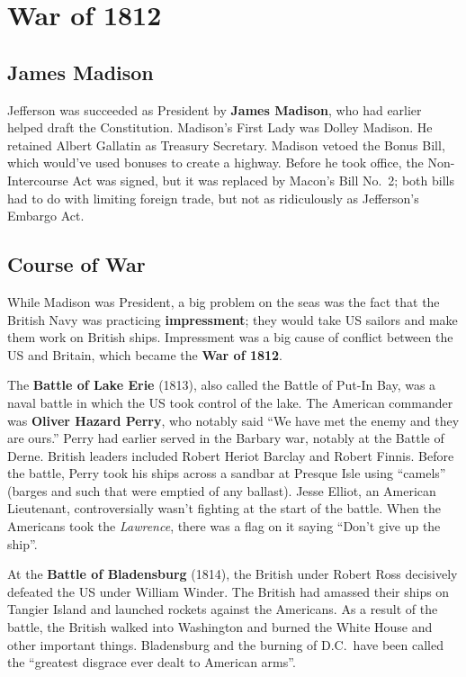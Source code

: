 \section{War of 1812}

\subsection*{James Madison}

Jefferson was succeeded as President by \textbf{James Madison}, who had earlier helped draft the Constitution.
Madison's First Lady was Dolley Madison.
He retained Albert Gallatin as Treasury Secretary.
Madison vetoed the Bonus Bill, which would've used bonuses to create a highway.
Before he took office, the Non-Intercourse Act was signed, but it was replaced by Macon's Bill No.\ 2;
both bills had to do with limiting foreign trade, but not as ridiculously as Jefferson's Embargo Act.

\subsection*{Course of War}

While Madison was President,
a big problem on the seas was the fact that the British Navy was practicing \textbf{impressment};
they would take US sailors and make them work on British ships.
Impressment was a big cause of conflict between the US and Britain, which became the \textbf{War of 1812}.

The \textbf{Battle of Lake Erie} (1813), also called the Battle of Put-In Bay,
was a naval battle in which the US took control of the lake.
The American commander was \textbf{Oliver Hazard Perry}, who notably said
``We have met the enemy and they are ours.''
Perry had earlier served in the Barbary war, notably at the Battle of Derne.
British leaders included Robert Heriot Barclay and Robert Finnis.
Before the battle, Perry took his ships across a sandbar at Presque Isle using ``camels''
(barges and such that were emptied of any ballast).
Jesse Elliot, an American Lieutenant, controversially wasn't fighting at the start of the battle.
When the Americans took the \textit{Lawrence}, there was a flag on it saying ``Don't give up the ship''.

At the \textbf{Battle of Bladensburg} (1814),
the British under Robert Ross decisively defeated the US under William Winder.
The British had amassed their ships on Tangier Island and launched rockets against the Americans.
As a result of the battle, the British walked into Washington and burned the White House and other important things.
Bladensburg and the burning of D.C.\ have been called the ``greatest disgrace ever dealt to American arms''.

